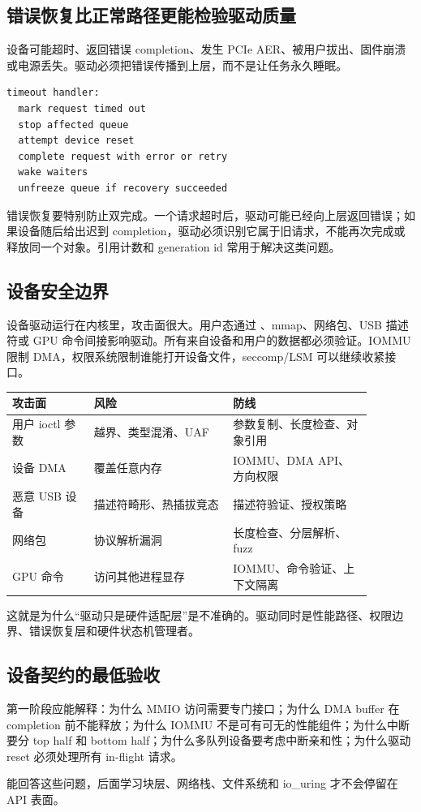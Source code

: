 \subsection{错误恢复比正常路径更能检验驱动质量}

设备可能超时、返回错误 completion、发生 PCIe AER、被用户拔出、固件崩溃或电源丢失。驱动必须把错误传播到上层，而不是让任务永久睡眠。

\begin{lstlisting}
timeout handler:
  mark request timed out
  stop affected queue
  attempt device reset
  complete request with error or retry
  wake waiters
  unfreeze queue if recovery succeeded
\end{lstlisting}

错误恢复要特别防止双完成。一个请求超时后，驱动可能已经向上层返回错误；如果设备随后给出迟到 completion，驱动必须识别它属于旧请求，不能再次完成或释放同一个对象。引用计数和 generation id 常用于解决这类问题。

\subsection{设备安全边界}

设备驱动运行在内核里，攻击面很大。用户态通过 、mmap、网络包、USB 描述符或 GPU 命令间接影响驱动。所有来自设备和用户的数据都必须验证。IOMMU 限制 DMA，权限系统限制谁能打开设备文件，seccomp/LSM 可以继续收紧接口。

\begin{longtable}{p{0.2\linewidth}p{0.34\linewidth}p{0.34\linewidth}}
\toprule
攻击面 & 风险 & 防线 \\
\midrule
用户 ioctl 参数 & 越界、类型混淆、UAF & 参数复制、长度检查、对象引用 \\
设备 DMA & 覆盖任意内存 & IOMMU、DMA API、方向权限 \\
恶意 USB 设备 & 描述符畸形、热插拔竞态 & 描述符验证、授权策略 \\
网络包 & 协议解析漏洞 & 长度检查、分层解析、fuzz \\
GPU 命令 & 访问其他进程显存 & IOMMU、命令验证、上下文隔离 \\
\bottomrule
\end{longtable}

这就是为什么“驱动只是硬件适配层”是不准确的。驱动同时是性能路径、权限边界、错误恢复层和硬件状态机管理者。

\subsection{设备契约的最低验收}

第一阶段应能解释：为什么 MMIO 访问需要专门接口；为什么 DMA buffer 在 completion 前不能释放；为什么 IOMMU 不是可有可无的性能组件；为什么中断要分 top half 和 bottom half；为什么多队列设备要考虑中断亲和性；为什么驱动 reset 必须处理所有 in-flight 请求。

能回答这些问题，后面学习块层、网络栈、文件系统和 io\_uring 才不会停留在 API 表面。
